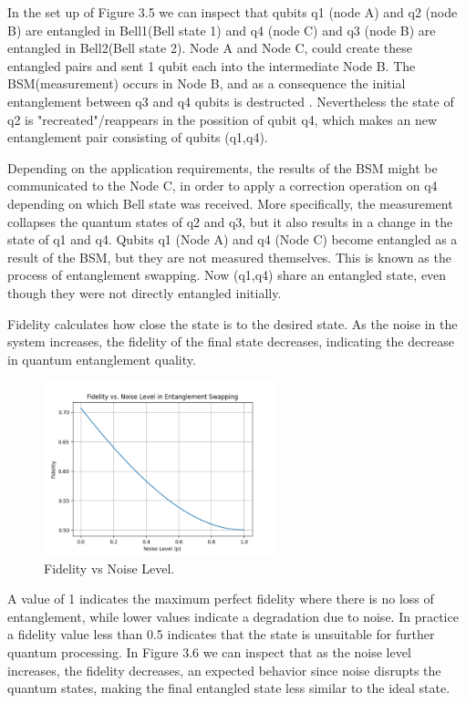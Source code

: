 \documentclass[12pt,a4paper] {report}
\begin{document}
		In the set up of Figure 3.5 we can inspect that qubits q1 (node A) and q2 (node B) are
		entangled in Bell1(Bell state 1) and q4 (node C) and q3 (node B) are entangled in Bell2(Bell state 2).
		Node A and Node C, could create these entangled pairs and sent 1 qubit each into the intermediate
		Node B. The BSM(measurement) occurs in Node B, and as a consequence the initial entanglement between
		q3 and q4 qubits is destructed \cite{rfc}. Nevertheless the state of q2 is "recreated"/reappears in the possition
		of qubit q4, which makes an new entanglement pair consisting of qubits (q1,q4).

		Depending on the application requirements, the results of the BSM might be communicated to the Node C, in order
		to apply a correction operation on q4 depending on which Bell state was received. More specifically, the measurement
		collapses the quantum states of q2 and q3, but it also results in a change in the state of q1 and q4.
		Qubits q1 (Node A) and q4 (Node C) become entangled as a result of the BSM, but they are not measured themselves.
		This is known as the process of entanglement swapping. Now (q1,q4) share an entangled state, even though they 
		were not directly entangled initially.

		Fidelity calculates how close the state is to the desired state. 
		As the noise in the system increases, the fidelity of the final state decreases,
		indicating the decrease in quantum entanglement quality.

		\begin{figure}[h!]
			\centering
			\includegraphics[width=0.6\textwidth]{repeater/fid_vs_noise.png}
			\caption{Fidelity vs Noise Level.}
			\label{fig:}
		\end{figure}		

		A value of 1 indicates the maximum perfect fidelity where there is no loss of entanglement, 
		while lower values indicate a degradation due to noise.
		In practice a fidelity value less than 0.5 indicates that the state is unsuitable for further quantum processing.
		In Figure 3.6 we can inspect that as the noise level increases, the fidelity decreases,
		an expected behavior since noise disrupts the quantum states,
		making the final entangled state less similar to the ideal state.
\end{document}

